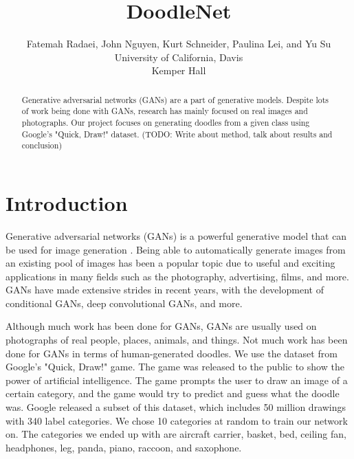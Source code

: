 \documentclass[10pt,twocolumn,letterpaper]{article}
\begin{document}
    
    \title{DoodleNet}
    
    \author{Fatemah Radaei, John Nguyen, Kurt Schneider, Paulina Lei, and Yu Su \\
    University of California, Davis\\
    Kemper Hall\\}
    
    \maketitle
    
    \begin{abstract}
       Generative adversarial networks (GANs) are a part of generative models. Despite lots of work being done with GANs, research has mainly focused on real images and photographs. Our project focuses on generating doodles from a given class using Google's "Quick, Draw!" dataset.
       (TODO: Write about method, talk about results and conclusion)
    \end{abstract}
    
    \section{Introduction}
    Generative adversarial networks (GANs) is a powerful generative model that can be used for image generation \cite{Goodfellow}. Being able to automatically generate images from an existing pool of images has been a popular topic due to useful and exciting applications in many fields such as the photography, advertising, films, and more. GANs have made extensive strides in recent years, with the development of conditional GANs, deep convolutional GANs, and more.
    
    Although much work has been done for GANs, GANs are usually used on photographs of real people, places, animals, and things. Not much work has been done for GANs in terms of human-generated doodles. We use the dataset from Google's "Quick, Draw!" game. The game was released to the public to show the power of artificial intelligence. The game prompts the user to draw an image of a certain category, and the game would try to predict and guess what the doodle was. Google released a subset of this dataset, which includes 50 million drawings with 340 label categories. We chose 10 categories at random to train our network on. The categories we ended up with are aircraft carrier, basket, bed, ceiling fan, headphones, leg, panda, piano, raccoon, and saxophone.
\end{document}
